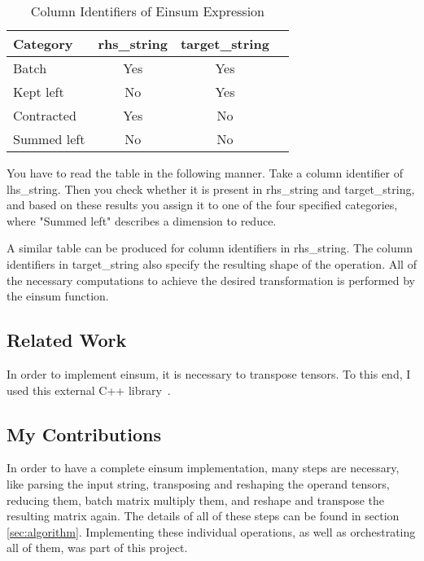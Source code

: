 \documentclass[sigconf]{acmart}
\renewcommand{\texttt}[1]{\begingroup\ttfamily\sloppy\hbadness=10000 #1\endgroup}
\begin{document}
\begin{table}[h!]
  \centering
  \caption{Column Identifiers of Einsum Expression}
  \label{tab:column_identifiers}
  \begin{tabular}{lccc}
    \toprule
    \textbf{Category} & \textbf{rhs\_string} & \textbf{target\_string} \\
    \midrule
    Batch              & Yes    & Yes    \\
    Kept left          & No     & Yes    \\
    Contracted         & Yes    & No     \\
    Summed left        & No     & No     \\
    \bottomrule
  \end{tabular}
\end{table}
\noindent
You have to read the table in the following manner. Take a column identifier of \texttt{lhs\_string}. Then you check whether it is present in \texttt{rhs\_string} and \texttt{target\_string}, and based on these results you assign it to one of the four specified categories, where "Summed left" describes a dimension to reduce.

A similar table can be produced for column identifiers in \texttt{rhs\_string}. The column identifiers in \texttt{target\_string} also specify the resulting shape of the operation. All of the necessary computations to achieve the desired transformation is performed by the einsum function.

\subsection{Related Work}
In order to implement einsum, it is necessary to transpose tensors. To this end, I used {this external C++ library}~\cite{hptt2017}.

\subsection{My Contributions}
In order to have a complete einsum implementation, many steps are necessary, like parsing the input string, transposing and reshaping the operand tensors, reducing them, batch matrix multiply them, and reshape and transpose the resulting matrix again. The details of all of these steps can be found in section \ref{sec:algorithm}. Implementing these individual operations, as well as orchestrating all of them, was part of this project.
\end{document}
